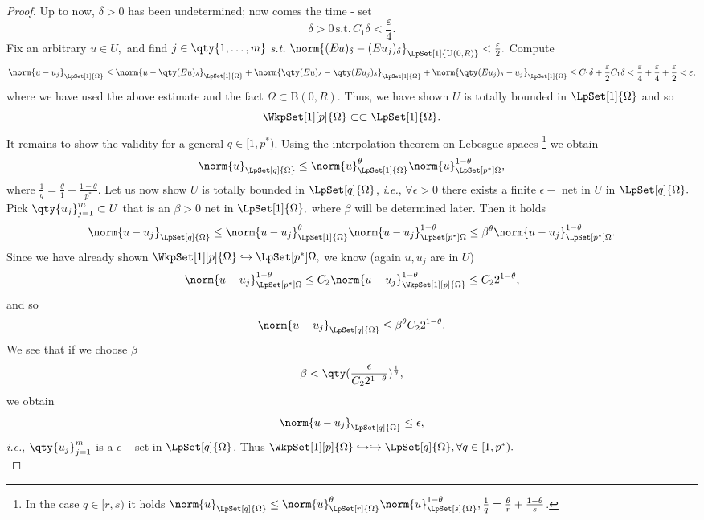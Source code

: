 \begin{proof}
	Up to now, $\delta >0$ has been undetermined; now comes the time -  set
	\[
		\delta >0 \, \text{s.t.} \, C_1 \delta < \frac{\varepsilon}{4}.
	\]
	Fix an arbitrary $u \in U,$ and find $j \in \qty{1,\dots,m}$ \textit{s.t.} $\norm{(Eu)_{\delta}-(Eu_j)_{\delta}}_{\LpSet[1]{\text{U}(0,R)}} < \frac{\varepsilon}{2}.$ Compute
	\[
		\norm{u-u_j}_{\LpSet[1]{\Omega}} \leq \norm{u-\qty(Eu)_{\delta}}_{\LpSet[1]{\Omega}} + \norm{\qty(Eu)_{\delta}-\qty(Eu_j)_{\delta}}_{\LpSet[1]{\Omega}}+ \norm{\qty(Eu_j)_{\delta}-u_j}_{\LpSet[1]{\Omega}}\leq C_1 \delta + \frac{\varepsilon}{2} C_1 \delta < \frac{\varepsilon}{4} + \frac{\varepsilon}{4} + \frac{\varepsilon}{2} < \varepsilon,
	\]
	where we have used the above estimate and the fact $\Omega \subset \text{B}(0,R).$
	Thus, we have shown $U$ is totally bounded in $\LpSet[1]{\Omega}$ and so
	\[
		\WkpSet[1][p]{\Omega} \subset \subset \LpSet[1]{\Omega}.
	\]
	It remains to show the validity for a general $q \in [1,p^{*})$. Using the interpolation theorem on Lebesgue spaces \footnote{In the case $q \in [r,s)$ it holds $\norm{u}_{\LpSet[q]{\Omega}} \leq \norm{u}_{\LpSet[r]{\Omega}}^{\theta}\norm{u}_{\LpSet[s]{\Omega}}^{1-\theta}, \frac{1}{q} = \frac{\theta}{r} + \frac{1-\theta}{s}$.} we obtain
	\[
		\norm{u}_{\LpSet[q]{\Omega}} \leq \norm{u}_{\LpSet[1]{\Omega}}^{\theta}\norm{u}_{\LpSet[p^{*}]{\Omega}}^{1-\theta},
	\]
	where $\frac{1}{q} = \frac{\theta}{1} + \frac{1-\theta}{p^{*}}.$  Let us now show $U$ is totally bounded in $\LpSet[q]{\Omega}$, \textit{i.e.}, $\forall \epsilon >0$ there exists a finite $\epsilon-$ net in $U$ in $\LpSet[q]{\Omega}.$ Pick $\qty{u_j}_{j=1}^m \subset U$ that is an $\beta >0$ net in $\LpSet[1]{\Omega},$ where $\beta$ will be determined later. Then it holds
	\[
		\norm{u-u_j}_{\LpSet[q]{\Omega}}\leq \norm{u-u_j}_{\LpSet[1]{\Omega}}^\theta \norm{u-u_j}_{\LpSet[p^{*}]{\Omega}}^{1-\theta} \leq  \beta^\theta \norm{u- u_j}_{\LpSet[p^{*}]{\Omega}}^{1-\theta}.
	\]
	Since we have already shown $\WkpSet[1][p]{\Omega} \hookrightarrow \LpSet[p^{*}]{\Omega},$ we know (again $u, u_j$ are in $U$)
	\[
		\norm{u-u_j}_{\LpSet[p^{*}]{\Omega}}^{1-\theta} \leq C_2 \norm{u - u_j}_{\WkpSet[1][p]{\Omega}}^{1-\theta} \leq C_2 2^{1-\theta},
	\]
	and so
	\[
		\norm{u-u_j}_{\LpSet[q]{\Omega}} \leq \beta^{\theta}C_2 2^{1-\theta}.
	\]
	We see that if we choose $\beta$ \, \,
	\[
		\beta < \qty(\frac{\epsilon}{C_2 2^{1-\theta}})^{\frac{1}{\theta}},
	\]
	we obtain
	\[
		\norm{u - u_j}_{\LpSet[q]{\Omega}} \leq \epsilon,
	\]
	\textit{i.e.}, $\qty{u_j}_{j=1}^m$ is a $\epsilon-$set in $\LpSet[q]{\Omega}$. Thus $\WkpSet[1][p]{\Omega} \hookrightarrow \hookrightarrow \LpSet[q]{\Omega}, \forall q \in [1, p^{*}).$ \\


\end{proof}

